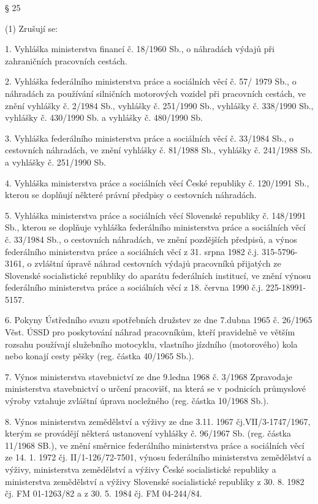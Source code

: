 \documentclass[11pt,a4paper]{article}
\begin{document}
§ 25

(1) Zrušují se:

1. Vyhláška ministerstva financí č. 18/1960 Sb., o náhradách výdajů při zahraničních pracovních cestách.

2. Vyhláška federálního ministerstva práce a sociálních věcí č. 57/ 1979 Sb., o náhradách za používání silničních motorových vozidel při pracovních cestách, ve znění vyhlášky č. 2/1984 Sb., vyhlášky č. 251/1990 Sb., vyhlášky č. 338/1990 Sb., vyhlášky č. 430/1990 Sb. a vyhlášky č. 480/1990 Sb.

3. Vyhláška federálního ministerstva práce a sociálních věcí č. 33/1984 Sb., o cestovních náhradách, ve znění vyhlášky č. 81/1988 Sb., vyhlášky č. 241/1988 Sb. a vyhlášky č. 251/1990 Sb.

4. Vyhláška ministerstva práce a sociálních věcí České republiky č. 120/1991 Sb., kterou se doplňují některé právní předpisy o cestovních náhradách.

5. Vyhláška ministerstva práce a sociálních věcí Slovenské republiky č. 148/1991 Sb., kterou se doplňuje vyhláška federálního ministerstva práce a sociálních věcí č. 33/1984 Sb., o cestovních náhradách, ve znění pozdějších předpisů, a výnos federálního ministerstva práce a sociálních věcí z 31. srpna 1982 č.j. 315-5796-3161, o zvláštní úpravě náhrad cestovních výdajů pracovníků přijatých ze Slovenské socialistické republiky do aparátu federálních institucí, ve znění výnosu federálního ministerstva práce a sociálních věcí z 18. června 1990 č.j. 225-18991-5157.

6. Pokyny Ústředního svazu spotřebních družstev ze dne 7.dubna 1965 č. 26/1965 Věst. ÚSSD pro poskytování náhrad pracovníkům, kteří pravidelně ve větším rozsahu používají služebního motocyklu, vlastního jízdního (motorového) kola nebo konají cesty pěšky (reg. částka 40/1965 Sb.).

7. Výnos ministerstva stavebnictví ze dne 9.ledna 1968 č. 3/1968 Zpravodaje ministerstva stavebnictví o určení pracovišť, na která se v podnicích průmyslové výroby vztahuje zvláštní úprava nocležného (reg. částka 10/1968 Sb.).

8. Výnos ministerstva zemědělství a výživy ze dne 3.11. 1967 čj.VII/3-1747/1967, kterým se provádějí některá ustanovení vyhlášky č. 96/1967 Sb. (reg. částka 11/1968 SB.), ve znění směrnice federálního ministerstva práce a sociálních věcí ze 14. 1. 1972 čj. II/1-126/72-7501, výnosu federálního ministerstva zemědělství a výživy, ministerstva zemědělství a výživy České socialistické republiky a ministerstva zemědělství a výživy Slovenské socialistické republiky z 30. 8. 1982 čj. FM 01-1263/82 a z 30. 5. 1984 čj. FM 04-244/84.
\end{document}
